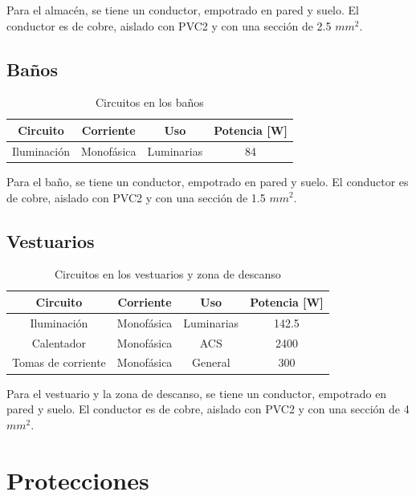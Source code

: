 \documentclass[../main.tex]{subfiles}
\begin{document}
Para el almacén, se tiene un conductor, empotrado en pared y suelo. El conductor es de cobre, aislado con PVC2 y con una sección de 2.5 $mm^2$.

\subsection{Baños}

\begin{table}[H]
    \centering
    \begin{tabular}{c|c|c|c}
        Circuito & Corriente & Uso & Potencia [W]  \\ \hline
        Iluminación & Monofásica & Luminarias & 84 \\

    \end{tabular}
    \caption{Circuitos en los baños} 
\end{table}

Para el baño, se tiene un conductor, empotrado en pared y suelo. El conductor es de cobre, aislado con PVC2 y con una sección de 1.5 $mm^2$.


\subsection{Vestuarios}

\begin{table}[H]
    \centering
    \begin{tabular}{c|c|c|c}
        Circuito & Corriente & Uso & Potencia [W]  \\ \hline
        Iluminación & Monofásica & Luminarias & 142.5 \\
        Calentador & Monofásica & ACS  & 2400 \\
        Tomas de corriente  & Monofásica & General & 300 \\
        
    \end{tabular}
    \caption{Circuitos en los vestuarios y zona de descanso} 
\end{table}

Para el vestuario y la zona de descanso, se tiene un conductor, empotrado en pared y suelo. El conductor es de cobre, aislado con PVC2 y con una sección de 4 $mm^2$.


\section{Protecciones}
\end{document}
